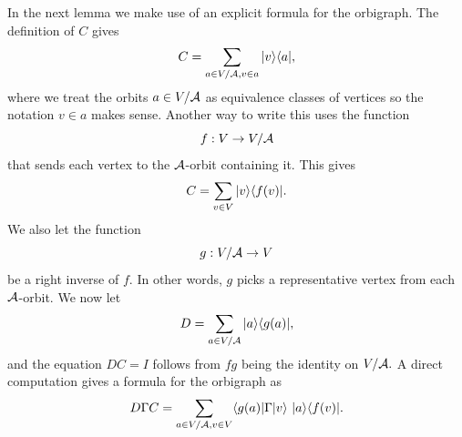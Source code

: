 In the next lemma we make use of an explicit formula
for the orbigraph.
The definition of $C$ gives 
$$
    C = \sum_{a\in V/\mathcal{A}, v\in a} |{v}\rangle\langle{a}|,
$$
where we treat the orbits $a\in V/\mathcal{A}$ as equivalence classes of vertices
so the notation $v\in a$ makes sense.
Another way to write this uses the function 
$$
    f : V \to V/\mathcal{A}
$$
that sends each vertex to the $\mathcal{A}$-orbit containing it.
This gives 
\begin{equation}\label{eqforC}
    C = \sum_{v\in V} |{v}\rangle\langle{f(v)}|.
\end{equation}
We also let the function 
$$
    g : V/\mathcal{A} \to V
$$
be a right inverse of $f.$ In other words, $g$ picks a
representative vertex from each $\mathcal{A}$-orbit.
We now let  
\begin{equation}\label{eqforD}
    D = \sum_{a\in V/\mathcal{A}} |{a}\rangle\langle{g(a)}|,
\end{equation}
and the equation $DC=I$ follows from $fg$ being the identity on $V/\mathcal{A}.$
A direct computation gives a formula for the orbigraph as
\begin{equation}\label{eqforOrbi}
    D\Gamma C = \sum_{a\in V/\mathcal{A}, v\in V} \langle{g(a)}| \Gamma |{v}\rangle\ |{a}\rangle\langle{f(v)}|.
\end{equation}

